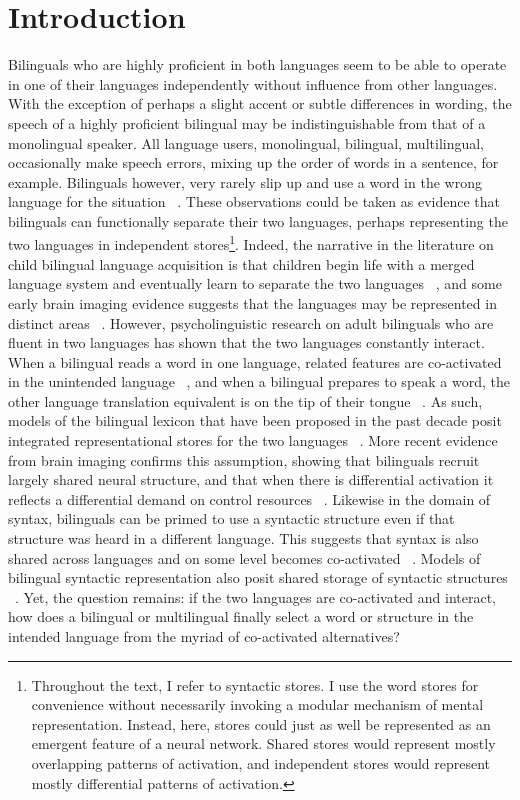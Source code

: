 \chapter{Introduction} 
\label{generalintroduction}

Bilinguals who are highly proficient in both languages seem to be able to operate in one of their languages independently without influence from other languages. With the exception of perhaps a slight accent or subtle differences in wording, the speech of a highly proficient bilingual may be indistinguishable from that of a monolingual speaker. All language users, monolingual, bilingual, multilingual, occasionally make speech errors, mixing up the order of words in a sentence, for example. Bilinguals however, very rarely slip up and use a word in the wrong language for the situation ~\citep{Poulisse1994}. These observations could be taken as evidence that bilinguals can functionally separate their two languages, perhaps representing the two languages in independent stores\footnote{Throughout the text, I refer to syntactic stores. I use the word stores for convenience without necessarily invoking a modular mechanism of mental representation. Instead, here, stores could just as well be represented as an emergent feature of a neural network. Shared stores would represent mostly overlapping patterns of activation, and independent stores would represent mostly differential patterns of activation.}. Indeed, the narrative in the literature on child bilingual language acquisition is that children begin life with a merged language system and eventually learn to separate the two languages ~\citep[e.g.,][]{Burns2007}, and some early brain imaging evidence suggests that the languages may be represented in distinct areas ~\citep[e.g.,][]{Kim1997}. However, psycholinguistic research on adult bilinguals who are fluent in two languages has shown that the two languages constantly interact. When a bilingual reads a word in one language, related features are co-activated in the unintended language ~\citep[e.g.,][]{Dijkstra2005}, and when a bilingual prepares to speak a word, the other language translation equivalent is on the tip of their tongue ~\citep[e.g.,][]{Kroll2006}. As such, models of the bilingual lexicon that have been proposed in the past decade posit integrated representational stores for the two languages ~\citep{Dijkstra2002}. More recent evidence from brain imaging confirms this assumption, showing that bilinguals recruit largely shared neural structure, and that when there is differential activation it reflects a differential demand on control resources ~\citep{Abutalebi2007}. Likewise in the domain of syntax, bilinguals can be primed to use a syntactic structure even if that structure was heard in a different language. This suggests that syntax is also shared across languages and on some level becomes co-activated ~\citep{Loebell2003}. Models of bilingual syntactic representation also posit shared storage of syntactic structures ~\citep{Schoonbaert2007}. Yet, the question remains: if the two languages are co-activated and interact, how does a bilingual or multilingual finally select a word or structure in the intended language from the myriad of co-activated alternatives? 

